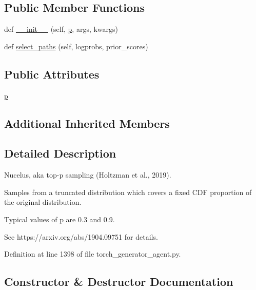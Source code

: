 \subsection*{Public Member Functions}
\begin{DoxyCompactItemize}
\item 
def \hyperlink{classparlai_1_1core_1_1torch__generator__agent_1_1NucleusSampling_a90c444c7fa1f76baac3a54fc7c980e15}{\+\_\+\+\_\+init\+\_\+\+\_\+} (self, \hyperlink{classparlai_1_1core_1_1torch__generator__agent_1_1NucleusSampling_a54a43b58e2e2cf7da776c40311e0a3c1}{p}, args, kwargs)
\item 
def \hyperlink{classparlai_1_1core_1_1torch__generator__agent_1_1NucleusSampling_a91abde2fb2dccf5cd0564825ddc5ea4d}{select\+\_\+paths} (self, logprobs, prior\+\_\+scores)
\end{DoxyCompactItemize}
\subsection*{Public Attributes}
\begin{DoxyCompactItemize}
\item 
\hyperlink{classparlai_1_1core_1_1torch__generator__agent_1_1NucleusSampling_a54a43b58e2e2cf7da776c40311e0a3c1}{p}
\end{DoxyCompactItemize}
\subsection*{Additional Inherited Members}


\subsection{Detailed Description}
\begin{DoxyVerb}Nucelus, aka top-p sampling (Holtzman et al., 2019).

Samples from a truncated distribution which covers a fixed CDF proportion
of the original distribution.

Typical values of p are 0.3 and 0.9.

See https://arxiv.org/abs/1904.09751 for details.
\end{DoxyVerb}
 

Definition at line 1398 of file torch\+\_\+generator\+\_\+agent.\+py.



\subsection{Constructor \& Destructor Documentation}
\mbox{\label{classparlai_1_1core_1_1torch__generator__agent_1_1NucleusSampling_a90c444c7fa1f76baac3a54fc7c980e15}} 
